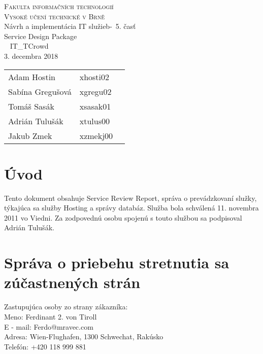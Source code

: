 \documentclass[a4paper, 11pt]{article}
\begin{document}
\begin{center}
\Huge
\textsc{Fakulta informačních technologií\\
Vysoké učení technické v Brně}
\\[84mm]
\LARGE Návrh a implementácia IT služieb\--\ 5. časť\\
\Huge Service Design Package \\\
\vspace{3.5cm}
\LARGE IT\_TCrowd\\
\Large 3. decembra 2018
\end{center}

\hfill

\begin{minipage}[l]{0.6 \textwidth}
\Large
\begin{tabular}{l l l}
Adam Hostin  & xhosti02\\
Sabína Gregušová & xgregu02\\
Tomáš Sasák & xsasak01 \\
Adrián Tulušák  & xtulus00 \\
Jakub Zmek & xzmekj00 \\
\end{tabular}
\end{minipage}
\thispagestyle{empty}
\clearpage

\setcounter{page}{1}

\section*{Úvod}
Tento dokument obsahuje Service Review Report, správa o prevádzkovaní služky, týkajúca sa služby Hosting a správy databáz. Služba bola schválená 11. novembra 2011 vo Viedni. Za zodpovednú osobu spojenú s touto službou sa podpisoval Adrián Tulušák.

\section*{Správa o priebehu stretnutia sa zúčastnených strán}
Zastupujúca osoby zo strany zákazníka:\\
Meno: Ferdinant 2. von Tiroll\\
E - mail: Ferdo@mravec.com\\
Adresa: Wien-Flughafen, 1300 Schwechat, Rakúsko\\
Telefón: +420 118 999 881\\
\end{document}
